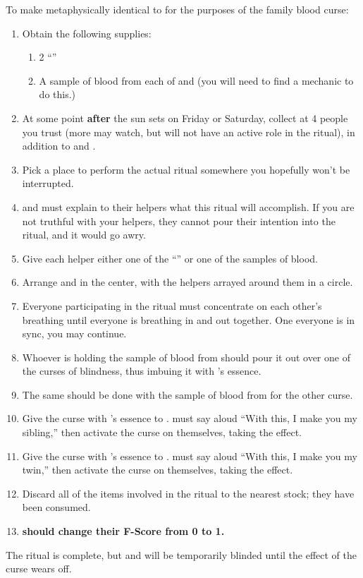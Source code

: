 \documentclass[green]{GL2020}
\begin{document}
To make \cAmbition{} metaphysically identical to \cHeir{} for the purposes of the \cFaledonParent{\formal} family blood curse:
\begin{enumerate}
  \item Obtain the following supplies:
  \begin{enumerate}
    \item 2 ``\iBlindness{}''
    \item A sample of blood from each of \cHeir{} and \cAmbition{} (you will need to find a mechanic to do this.)
  \end{enumerate}
  \item At some point \textbf{after} the sun sets on Friday or Saturday, collect at 4 people you trust (more may watch, but will not have an active role in the ritual), in addition to \cHeir{} and \cAmbition{}.
  \item Pick a place to perform the actual ritual somewhere you hopefully won’t be interrupted.
  \item \cHeir{} and \cAmbition{} must explain to their helpers what this ritual will accomplish. If you are not truthful with your helpers, they cannot pour their intention into the ritual, and it would go awry.
  \item Give each helper either one of the ``\iBlindness{}'' or one of the samples of blood. %
  \item Arrange \cHeir{} and \cAmbition{} in the center, with the helpers arrayed around them in a circle.
  \item Everyone participating in the ritual must concentrate on each other’s breathing until everyone is breathing in and out together.  One everyone is in sync, you may continue.
  \item Whoever is holding the sample of blood from \cHeir{} should pour it out over one of the curses of blindness, thus imbuing it with \cHeir{}’s essence.
  \item The same should be done with the sample of blood from \cAmbition{} for the other curse.
  \item Give the curse with \cHeir{}’s essence to \cAmbition{}. \cAmbition{} must say aloud ``With this, I make you my sibling,'' then activate the curse on themselves, taking the effect.
  \item Give the curse with \cAmbition{}’s essence to \cHeir{}. \cHeir{} must say aloud ``With this, I make you my twin,'' then activate the curse on themselves, taking the effect.
  \item Discard all of the items involved in the ritual to the nearest stock; they have been consumed.
  \item \textbf{\cAmbition{} should change their F-Score from 0 to 1.}
\end{enumerate}

The ritual is complete, but \cHeir{} and \cAmbition{} will be temporarily blinded until the effect of the curse wears off.
\end{document}
